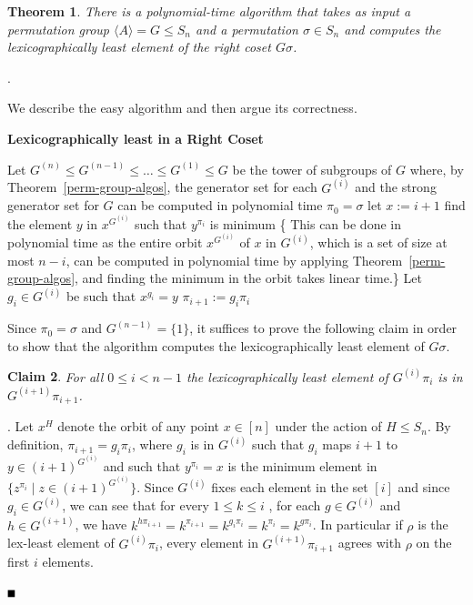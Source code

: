 \documentclass{article}
\newtheorem{theorem}{Theorem}[section]
\newtheorem{claim}[theorem]{Claim}
\newcommand{\bproof}{\noindent{\it Proof}}
\newcommand{\cproof}{\noindent{\it Proof of Claim}}
\newcommand{\eproof}{\hspace*{\fill}$\rule{2mm}{2mm}$~~~~~\bigskip}
\renewenvironment{proof}{\bproof. }{\eproof}
\newenvironment{claimproof}{\cproof. }{\hspace*{\fill}\vspace{5mm}}
\renewcommand{\angle}[1]{\langle #1\rangle}
\begin{document}
\begin{theorem}\label{lexleast}
  There is a polynomial-time algorithm that takes as input a
  permutation group $\angle{A}=G \leq S_n$ and a permutation
  $\sigma\in S_n$ and computes the lexicographically least element of
  the right coset $G \sigma$.
\end{theorem}

\begin{proof}

 We describe the easy algorithm and then argue its correctness.

\begin{algorithm}[H]
        \caption{{\bf Lexicographically least in a Right Coset}}
        Let $G^{(n)}\leq G^{(n-1)}\leq\ldots\leq G^{(1)}\leq G$ be 
        the tower of subgroups of $G$ where, by 
         Theorem~\ref{perm-group-algos}, the generator set for 
        each $G^{(i)}$ and the strong generator set for $G$ can 
        be computed in polynomial time\;
        $\pi_0 = \sigma$\;
        {
                let $x := i+1$\;
                find the element $y$ in $x^{G^{(i)}}$ such that
                $y^{\pi_i}$ is minimum\;
\{ This can be done in polynomial time as the entire orbit 
$x^{G^{(i)}}$ of $x$ in $G^{(i)}$, which is a set of size at most $n-i$, 
can be computed in polynomial time by applying 
Theorem~\ref{perm-group-algos}, and finding the minimum in the orbit 
takes linear time.\}\;
                Let $g_i \in G^{(i)}$ be such that $x^{g_i} = y$\;
                $\pi_{i+1} := g_i \pi_i$\;
        }
\end{algorithm}

Since $\pi_0 = \sigma$ and $G^{(n-1)} = \{ 1 \}$, it suffices to prove
the following claim in order to show that the algorithm computes the
lexicographically least element of $G\sigma$.

\begin{claim}\label{claim1}
  For all $0 \leq i <n-1$ the lexicographically least element of
  $G^{(i)}\pi_i$ is in $G^{(i+1)} \pi_{i+1}$.
\end{claim}

\begin{claimproof}
  Let $x^H$ denote the orbit of any point $x\in[n]$ under the action
  of $H\leq S_n$. By definition, $\pi_{i+1}=g_i\pi_i$, where $g_i$ is
  in $G^{(i)}$ such that $g_i$ maps $i+1$ to $y\in (i+1)^{G^{(i)}}$
  and such that $y^{\pi_i}=x$ is the minimum element in
  $\{z^{\pi_i}\mid z\in (i+1)^{G^{(i)}}\}$.  Since $G^{(i)}$ fixes
  each element in the set $[i]$ and since $g_i \in G^{(i)}$, we can
  see that for every $1 \leq k \leq i$ , for each $g \in G^{(i)}$ and
  $h \in G^{(i+1)}$, we have $ k^{h \pi_{i+1}} = k^{\pi_{i+1}} =
  k^{g_i \pi_i} = k^{\pi_i} = k^{g \pi_i} $. In particular if $\rho$
  is the lex-least element of $G^{(i)} \pi_i$, every element in
  $G^{(i+1)} \pi_{i+1}$ agrees with $\rho$ on the first $i$ elements.
  

\end{claimproof}
\end{proof}
\end{document}
